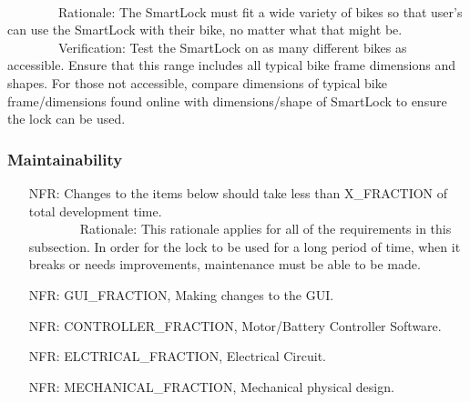 \documentclass[12pt]{article}
\newcounter{nfrnum} %
\begin{document}
\begin{itemize}
\\ \-\ \-\ \-\ \-\ \-\ \-\ \-\ \-\ Rationale: The SmartLock must fit a wide variety of bikes so that user's can use the SmartLock with their bike, no matter what that might be.
\\ \-\ \-\ \-\ \-\ \-\ \-\ \-\ \-\ Verification: Test the SmartLock on as many different bikes as accessible. Ensure that this range includes all typical bike frame dimensions and shapes. For those not accessible, compare dimensions of typical bike frame/dimensions found online with dimensions/shape of SmartLock to ensure the lock can be used. 
\end{itemize}

\subsubsection{Maintainability}
\begin{itemize}
\setlength{\itemindent}{.5in}
\item[NFR\refstepcounter{nfrnum}\thenfrnum\label{NFR17}:] Changes to the items below should take less than X\_FRACTION of total development time.
\\ \-\ \-\ \-\ \-\ \-\ \-\ \-\ \-\ Rationale: This rationale applies for all of the requirements in this subsection. In order for the lock to be used for a long period of time, when it breaks or needs improvements, maintenance must be able to be made. 
\item[NFR\refstepcounter{nfrnum}\thenfrnum\label{NFR18}:] GUI\_FRACTION, Making changes to the GUI.
\item[NFR\refstepcounter{nfrnum}\thenfrnum\label{NFR19}:] CONTROLLER\_FRACTION, Motor/Battery Controller Software.
\item[NFR\refstepcounter{nfrnum}\thenfrnum\label{NFR20}:] ELCTRICAL\_FRACTION, Electrical Circuit.
\item[NFR\refstepcounter{nfrnum}\thenfrnum\label{NFR21}:] MECHANICAL\_FRACTION, Mechanical physical design.
\end{itemize}
\end{document}
